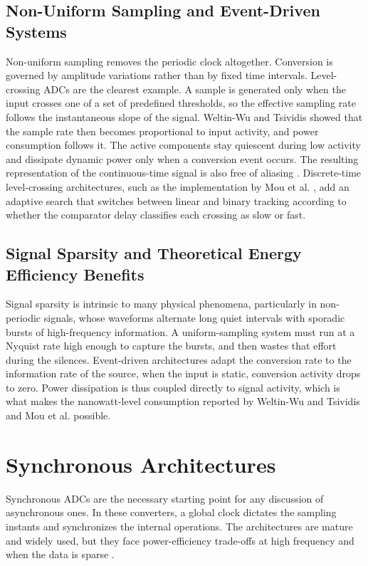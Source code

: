 \subsection{Non-Uniform Sampling and Event-Driven Systems}
Non-uniform sampling removes the periodic clock altogether. Conversion is governed by amplitude variations rather than by fixed time intervals. Level-crossing ADCs are the clearest example. A sample is generated only when the input crosses one of a set of predefined thresholds, so the effective sampling rate follows the instantaneous slope of the signal. Weltin-Wu and Tsividis \cite{weltin2013} showed that the sample rate then becomes proportional to input activity, and power consumption follows it. The active components stay quiescent during low activity and dissipate dynamic power only when a conversion event occurs. The resulting representation of the continuous-time signal is also free of aliasing \cite{weltin2013}. Discrete-time level-crossing architectures, such as the implementation by Mou et al. \cite{mou2026}, add an adaptive search that switches between linear and binary tracking according to whether the comparator delay classifies each crossing as slow or fast.

\subsection{Signal Sparsity and Theoretical Energy Efficiency Benefits}
Signal sparsity is intrinsic to many physical phenomena, particularly in non-periodic signals, whose waveforms alternate long quiet intervals with sporadic bursts of high-frequency information. A uniform-sampling system must run at a Nyquist rate high enough to capture the bursts, and then wastes that effort during the silences. Event-driven architectures adapt the conversion rate to the information rate of the source, when the input is static, conversion activity drops to zero. Power dissipation is thus coupled directly to signal activity, which is what makes the nanowatt-level consumption reported by Weltin-Wu and Tsividis \cite{weltin2013} and Mou et al. \cite{mou2026} possible.





\section{Synchronous Architectures} \label{sec:sync_arch}

Synchronous ADCs are the necessary starting point for any discussion of asynchronous ones. In these converters, a global clock dictates the sampling instants and synchronizes the internal operations. The architectures are mature and widely used, but they face power-efficiency trade-offs at high frequency and when the data is sparse \cite{johns_martin_2012}.


